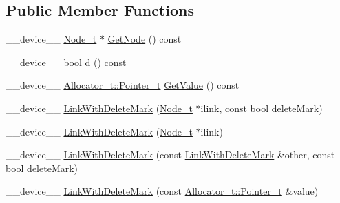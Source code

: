\subsection*{Public Member Functions}
\begin{DoxyCompactItemize}
\item 
\+\_\+\+\_\+device\+\_\+\+\_\+ \mbox{\hyperlink{class_n_u_c_a_r_lock_free_d_s_1_1_lock_free_doubly_linked_list_abb8fd1da564d74028552e980bc99a704}{Node\+\_\+t}} $\ast$ \mbox{\hyperlink{class_n_u_c_a_r_lock_free_d_s_1_1_lock_free_doubly_linked_list_1_1_link_with_delete_mark_a3f9ae9e135b17122984dbf716b46b951}{Get\+Node}} () const
\item 
\+\_\+\+\_\+device\+\_\+\+\_\+ bool \mbox{\hyperlink{class_n_u_c_a_r_lock_free_d_s_1_1_lock_free_doubly_linked_list_1_1_link_with_delete_mark_abd04793481353e77ddce79d713720e78}{d}} () const
\item 
\+\_\+\+\_\+device\+\_\+\+\_\+ \mbox{\hyperlink{class_n_u_c_a_r_lock_free_d_s_1_1_allocator_a3931e84d06ddd3b436103475197eb12a}{Allocator\+\_\+t\+::\+Pointer\+\_\+t}} \mbox{\hyperlink{class_n_u_c_a_r_lock_free_d_s_1_1_lock_free_doubly_linked_list_1_1_link_with_delete_mark_a8f162da8ad41d7cff01e66808b56cbd7}{Get\+Value}} () const
\item 
\+\_\+\+\_\+device\+\_\+\+\_\+ \mbox{\hyperlink{class_n_u_c_a_r_lock_free_d_s_1_1_lock_free_doubly_linked_list_1_1_link_with_delete_mark_a07b869cca6744dad3fef8ea26279b570}{Link\+With\+Delete\+Mark}} (\mbox{\hyperlink{class_n_u_c_a_r_lock_free_d_s_1_1_lock_free_doubly_linked_list_abb8fd1da564d74028552e980bc99a704}{Node\+\_\+t}} $\ast$ilink, const bool delete\+Mark)
\item 
\+\_\+\+\_\+device\+\_\+\+\_\+ \mbox{\hyperlink{class_n_u_c_a_r_lock_free_d_s_1_1_lock_free_doubly_linked_list_1_1_link_with_delete_mark_aedead35ab7fcb097d8bfdaf1178afb1c}{Link\+With\+Delete\+Mark}} (\mbox{\hyperlink{class_n_u_c_a_r_lock_free_d_s_1_1_lock_free_doubly_linked_list_abb8fd1da564d74028552e980bc99a704}{Node\+\_\+t}} $\ast$ilink)
\item 
\+\_\+\+\_\+device\+\_\+\+\_\+ \mbox{\hyperlink{class_n_u_c_a_r_lock_free_d_s_1_1_lock_free_doubly_linked_list_1_1_link_with_delete_mark_ac3ab968f96ba442b40d9bc8bd48a7604}{Link\+With\+Delete\+Mark}} (const \mbox{\hyperlink{class_n_u_c_a_r_lock_free_d_s_1_1_lock_free_doubly_linked_list_1_1_link_with_delete_mark}{Link\+With\+Delete\+Mark}} \&other, const bool delete\+Mark)
\item 
\+\_\+\+\_\+device\+\_\+\+\_\+ \mbox{\hyperlink{class_n_u_c_a_r_lock_free_d_s_1_1_lock_free_doubly_linked_list_1_1_link_with_delete_mark_a7b9929a559282ece56e8ae86c6c0957b}{Link\+With\+Delete\+Mark}} (const \mbox{\hyperlink{class_n_u_c_a_r_lock_free_d_s_1_1_allocator_a3931e84d06ddd3b436103475197eb12a}{Allocator\+\_\+t\+::\+Pointer\+\_\+t}} \&value)

\end{DoxyCompactItemize}
